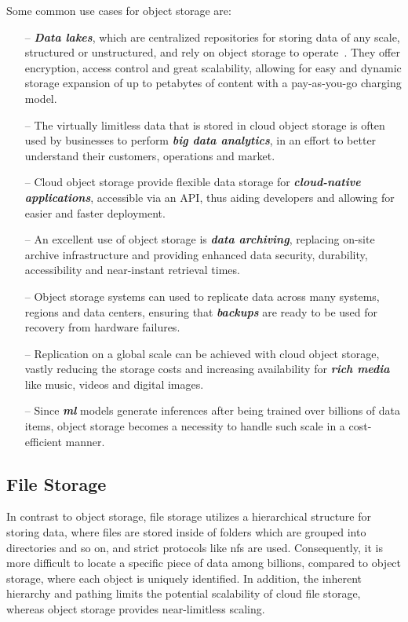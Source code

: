 Some common use cases for object storage are:
\begin{itemize}
    \item[--] \textit{\textbf{Data lakes}}, which are centralized repositories for storing data of any scale, structured or unstructured, and rely on object storage to operate~\cite{datalake}. They offer encryption, access control and great scalability, allowing for easy and dynamic storage expansion of up to petabytes of content with a pay-as-you-go charging model.

    \item[--] The virtually limitless data that is stored in cloud object storage is often used by businesses to perform \textit{\textbf{big data analytics}}, in an effort to better understand their customers, operations and market.

    \item [--] Cloud object storage provide flexible data storage for \textit{\textbf{cloud-native applications}}, accessible via an API, thus aiding developers and allowing for easier and faster deployment.

    \item[--] An excellent use of object storage is \textbf{\textit{data archiving}}, replacing on-site archive infrastructure and providing enhanced data security, durability, accessibility and near-instant retrieval times.

    \item [--] Object storage systems can used to replicate data across many systems, regions and data centers, ensuring that \textbf{\textit{backups}} are ready to be used for recovery from hardware failures.

    \item [--] Replication on a global scale can be achieved with cloud object storage, vastly reducing the storage costs and increasing availability for \textit{\textbf{rich media}} like music, videos and digital images.

    \item [--]  Since \textit{\textbf{\ac{ml}}} models generate inferences after being trained over billions of data items, object storage becomes a necessity to handle such scale in a cost-efficient manner.
\end{itemize}

\subsection{File Storage} In contrast to object storage, file storage utilizes a hierarchical structure for storing data, where files are stored inside of folders which are grouped into directories and so on, and strict protocols like \ac{nfs} are used. Consequently, it is more difficult to locate a specific piece of data among billions, compared to object storage, where each object is uniquely identified. In addition, the inherent hierarchy and pathing limits the potential scalability of cloud file storage, whereas object storage provides near-limitless scaling.

